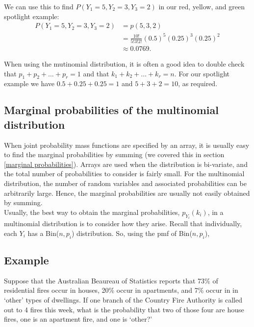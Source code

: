 \noindent We can use this to find $P(Y_1 = 5, Y_2 = 3, Y_3 = 2)$ in our red, yellow, and green spotlight example:
\begin{align*}
P(Y_1 = 5, Y_2 = 3, Y_3 = 2) & = p(5,3,2) \\
	& = \frac{10!}{5!3!2!}(0.5)^5(0.25)^3(0.25)^2 \tag{recall we had $n = 10$ trials} \\
	& \approx 0.0769.
\end{align*}

\noindent When using the mutinomial distribution, it is often a good idea to double check that $p_1 + p_2 + \ldots + p_r = 1$ and that $k_1 + k_2 + \ldots + k_r = n$. For our spotlight example we have $0.5 + 0.25 + 0.25 = 1$ and $5 + 3 + 2 = 10$, as required. \\


\subsection{Marginal probabilities of the multinomial distribution}
\noindent When joint probability mass functions are specified by an array, it is usually easy to find the marginal probabilities by summing (we covered this in section \ref{marginal probabilities}). Arrays are used when the distribution is bi-variate, and the total number of probabilities to consider is fairly small. For the multinomial distribution, the number of random variables and associated probabilities can be arbitrarily large. Hence, the marginal probabilities are usually not easily obtained by summing. \\

\noindent Usually, the best way to obtain the marginal probabilities, $p_{Y_i}(k_i)$, in a multinomial distribution is to consider how they arise. Recall that individually, each $Y_i$ has a Bin($n,p_i$) distribution. So, using the pmf of Bin($n,p_i$),

  	\bigskip
	
	\hfil{}
	\bigskip

\subsection{Example}
Suppose that the Australian Beaureau of Statistics reports that 73\% of residential fires occur in houses, 20\% occur in apartments, and 7\% occur in in `other' types of dwellings. If one branch of the Country Fire Authority is called out to 4 fires this week, what is the probability that two of those four are house fires, one is an apartment fire, and one is `other?' \\

